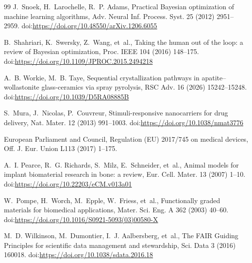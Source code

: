 \documentclass[11pt]{article}
\begin{document}
\begin{thebibliography}{99}
J.~Snoek, H.~Larochelle, R.~P. Adams, Practical Bayesian optimization of machine learning algorithms, Adv. Neural Inf. Process. Syst. 25 (2012) 2951--2959.
\newblock doi:\url{https://doi.org/10.48550/arXiv.1206.6055}


B.~Shahriari, K.~Swersky, Z.~Wang, et~al., Taking the human out of the loop: a review of Bayesian optimization, Proc. IEEE 104 (2016) 148--175.
\newblock doi:\url{https://doi.org/10.1109/JPROC.2015.2494218}


A.~B. Workie, M.~B. Taye, Sequential crystallization pathways in apatite--wollastonite glass-ceramics via spray pyrolysis, RSC Adv. 16 (2026) 15242--15248.
\newblock doi:\url{https://doi.org/10.1039/D5RA08885B}


S.~Mura, J.~Nicolas, P.~Couvreur, Stimuli-responsive nanocarriers for drug delivery, Nat. Mater. 12 (2013) 991--1003.
\newblock doi:\url{https://doi.org/10.1038/nmat3776}


European Parliament and Council, Regulation (EU) 2017/745 on medical devices, Off. J. Eur. Union L113 (2017) 1--175.


A.~I. Pearce, R.~G. Richards, S.~Milz, E.~Schneider, et~al., Animal models for implant biomaterial research in bone: a review, Eur. Cell. Mater. 13 (2007) 1--10.
\newblock doi:\url{https://doi.org/10.22203/eCM.v013a01}


W.~Pompe, H.~Worch, M.~Epple, W.~Friess, et~al., Functionally graded materials for biomedical applications, Mater. Sci. Eng. A 362 (2003) 40--60.
\newblock doi:\url{https://doi.org/10.1016/S0921-5093(03)00580-X}


M.~D. Wilkinson, M.~Dumontier, I.~J. Aalbersberg, et~al., The FAIR Guiding Principles for scientific data management and stewardship, Sci. Data 3 (2016) 160018.
\newblock doi:\url{https://doi.org/10.1038/sdata.2016.18}


\end{thebibliography}
\end{document}
